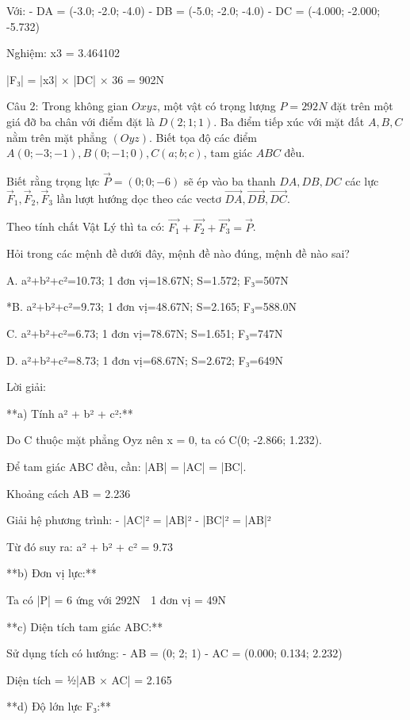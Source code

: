 \documentclass[a4paper,12pt]{article}
\begin{document}
Với:
- DA⃗ = (-3.0; -2.0; -4.0)
- DB⃗ = (-5.0; -2.0; -4.0)
- DC⃗ = (-4.000; -2.000; -5.732)

Nghiệm: x3 = 3.464102

|F₃| = |x3| × |DC⃗| × 36 = 902N




Câu 2: Trong không gian \(Oxyz\), một vật có trọng lượng \(P=292N\) đặt trên một giá đỡ ba chân với điểm đặt là \(D(2; 1; 1)\). Ba điểm tiếp xúc với mặt đất \(A, B, C\) nằm trên mặt phẳng \((Oyz)\). Biết tọa độ các điểm \(A(0; -3; -1), B(0; -1; 0), C(a; b; c)\), tam giác \(ABC\) đều. 

Biết rằng trọng lực \(\overrightarrow{P}=(0; 0; -6)\) sẽ ép vào ba thanh \(DA, DB, DC\) các lực \(\overrightarrow{F}_1, \overrightarrow{F}_2, \overrightarrow{F}_3\) lần lượt hướng dọc theo các vectơ \(\overrightarrow{DA}, \overrightarrow{DB}, \overrightarrow{DC}\). 

Theo tính chất Vật Lý thì ta có: \(\overrightarrow{F_1}+\overrightarrow{F_2}+\overrightarrow{F_3}=\overrightarrow{P}\).

Hỏi trong các mệnh đề dưới đây, mệnh đề nào đúng, mệnh đề nào sai?

A. a²+b²+c²=10.73; 1 đơn vị=18.67N; S=1.572; F₃=507N

*B. a²+b²+c²=9.73; 1 đơn vị=48.67N; S=2.165; F₃=588.0N

C. a²+b²+c²=6.73; 1 đơn vị=78.67N; S=1.651; F₃=747N

D. a²+b²+c²=8.73; 1 đơn vị=68.67N; S=2.672; F₃=649N

Lời giải:


**a) Tính a² + b² + c²:**

Do C thuộc mặt phẳng Oyz nên x = 0, ta có C(0; -2.866; 1.232).

Để tam giác ABC đều, cần: |AB| = |AC| = |BC|.

Khoảng cách AB = 2.236

Giải hệ phương trình:
- |AC|² = |AB|²  
- |BC|² = |AB|²

Từ đó suy ra: a² + b² + c² = 9.73

**b) Đơn vị lực:**

Ta có |P⃗| = 6 ứng với 292N
⟹ 1 đơn vị = 49N

**c) Diện tích tam giác ABC:**

Sử dụng tích có hướng:
- AB⃗ = (0; 2; 1)
- AC⃗ = (0.000; 0.134; 2.232)

Diện tích = ½|AB⃗ × AC⃗| = 2.165

**d) Độ lớn lực F₃:**
\end{document}

